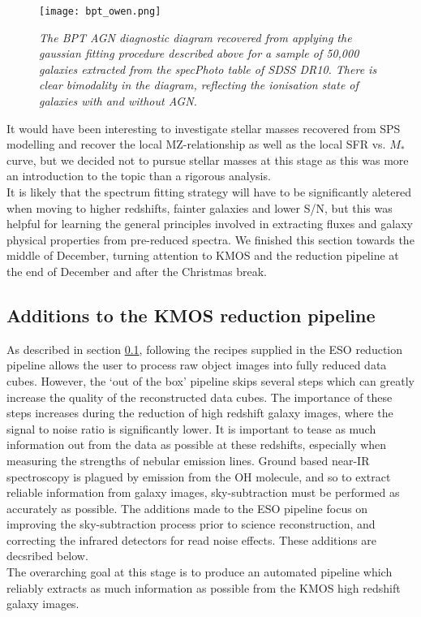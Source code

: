 \documentclass{literature}
\begin{document}
\begin{figure}[!htp]
\centering
\texttt{[image: bpt\_owen.png]}
\caption{\footnotesize{\emph{The BPT AGN diagnostic diagram recovered from applying the gaussian fitting procedure described above for a sample of 50,000 galaxies extracted from the specPhoto table of SDSS DR10. There is clear bimodality in the diagram, reflecting the ionisation state of galaxies with and without AGN.}}}
\label{fig:owen_bpt}
\end{figure}    

It would have been interesting to investigate stellar masses recovered from SPS modelling and recover the local MZ-relationship as well as the local SFR vs. $M_{*}$ curve, but we decided not to pursue stellar masses at this stage as this was more an introduction to the topic than a rigorous analysis. \\ 

It is likely that the  spectrum fitting strategy will have to be significantly aletered when moving to higher redshifts, fainter galaxies and lower S/N, but this was helpful for learning the general principles involved in extracting fluxes and galaxy physical properties from pre-reduced spectra. We finished this section towards the middle of December, turning attention to KMOS and the reduction pipeline at the end of December and after the Christmas break.   

\subsection{Additions to the KMOS reduction pipeline}\label{subsec:kmos_pipeline}

As described in section \ref{subsec:kmos_pipeline}, following the recipes supplied in the ESO reduction pipeline allows the user to process raw object images into fully reduced data cubes. However, the `out of the box' pipeline skips several steps which can greatly increase the quality of the reconstructed data cubes. The importance of these steps increases during the reduction of high redshift galaxy images, where the signal to noise ratio is significantly lower. It is important to tease as much information out from the data as possible at these redshifts, especially when measuring the strengths of nebular emission lines. Ground based near-IR spectroscopy is plagued by emission from the OH molecule, and so to extract reliable information from galaxy images, sky-subtraction must be performed as accurately as possible. The additions made to the ESO pipeline focus on improving the sky-subtraction process prior to science reconstruction, and correcting the infrared detectors for read noise effects. These additions are decsribed below.  \\ 
The overarching goal at this stage is to produce an automated pipeline which reliably extracts as much information as possible from the KMOS high redshift galaxy images. 
\end{document}
